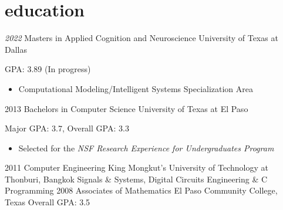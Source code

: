\documentclass[]{friggeri-cv} %
\begin{document}
\section{education}

\begin{entrylist}
\entry
{\emph{2022}}
{Masters {\normalfont in Applied Cognition and Neuroscience}}
{University of Texas at Dallas}
{GPA: 3.89 (In progress)
\begin{itemize}
\item Computational Modeling/Intelligent Systems Specialization Area
\end{itemize}}
\entry
{2013}
{Bachelors {\normalfont in Computer Science}}
{University of Texas at El Paso}
{Major GPA: 3.7, Overall GPA: 3.3
\begin{itemize}
\item Selected for the \emph{NSF Research Experience for Undergraduates Program}
\end{itemize}}
\entry
{2011}
{{\normalfont Computer Engineering}}
{King Mongkut’s University of Technology at Thonburi, Bangkok}
{Signals \& Systems, Digital Circuits Engineering \& C Programming}
\entry
{2008}
{Associates {\normalfont of Mathematics}}
{El Paso Community College, Texas}
{Overall GPA: 3.5}
\end{entrylist}



\end{document}
